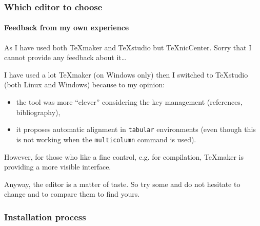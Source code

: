 \documentclass[11pt]{beamer}
\begin{document}
\begin{frame}
	\frametitle{Which editor to choose}
	\framesubtitle{Feedback from my own experience}
	
	As I have used both \TeX{}maker and \TeX{}studio but \alert{\TeX{}nicCenter}.
	Sorry that I cannot provide any feedback about it\dots
	
	I have used a lot \alert{\TeX{}maker} (on Windows only) then I switched to  \alert{\TeX{}studio} (both Linux and Windows) because to my opinion:
	\begin{itemize}
		\item the tool was more \enquote{clever} considering the key management (references, bibliography),
		\item it proposes automatic alignment in \texttt{tabular} environments (even though this is not working when the \texttt{multicolumn} command is used).
	\end{itemize}
	However, for those who like a fine control, e.g. for compilation, \TeX{}maker is providing a more visible interface.
	
	Anyway, the editor is a matter of taste. So try some and do not hesitate to change and to compare them to find yours.
\end{frame}


\begin{frame}
	\frametitle{Installation process}
	
\end{frame}

 
\end{document}

